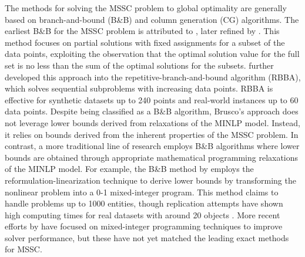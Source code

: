 The methods for solving the MSSC problem to global optimality are generally based on branch-and-bound (B\&B) and column generation (CG) algorithms. The earliest B\&B for the MSSC problem is attributed to \cite{koontz1975branch}, later refined by \cite{diehr1985evaluation}. This method focuses on partial solutions with fixed assignments for a subset of the data points, exploiting the observation that the optimal solution value for the full set is no less than the sum of the optimal solutions for the subsets. \cite{brusco2006repetitive} further developed this approach into the repetitive-branch-and-bound algorithm (RBBA), which solves sequential subproblems with increasing data points. RBBA is effective for synthetic datasets up to 240 points and real-world instances up to 60 data points. Despite being classified as a B\&B algorithm, Brusco's approach does not leverage lower bounds derived from relaxations of the MINLP model. Instead, it relies on bounds derived from the inherent properties of the MSSC problem. In contrast, a more traditional line of research employs B\&B algorithms where lower bounds are obtained through appropriate mathematical programming relaxations of the MINLP model. For example, the B\&B method by \cite{sherali2005global} employs the reformulation-linearization technique to derive lower bounds by transforming the nonlinear problem into a 0-1 mixed-integer program. This method claims to handle problems up to 1000 entities, though replication attempts have shown high computing times for real datasets with around 20 objects \citep{aloise2011evaluating}. More recent efforts by \cite{burgard2023mixed} have focused on mixed-integer programming techniques to improve solver performance, but these have not yet matched the leading exact methods for MSSC.

